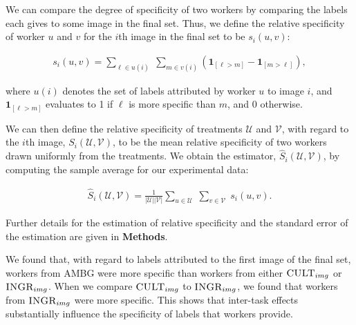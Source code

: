\documentclass[letterpaper,twocolumn]{article}
\begin{document}
We can compare the degree of specificity of two workers by comparing the 
labels each gives to some image in the final set.  Thus, we define the relative
specificity of worker $u$ and $v$ for the $i$th image in the final set to be
$s_i(u,v)$:

\begin{align}
	s_i(u,v) = \sum_{\ell \in u(i) } \;
	\sum_{m \in v(i)} 
	\left(\mathbf{1}_{[\ell > m]} - \mathbf{1}_{[m>\ell]}\right),
	\label{eq:worker-specificity}
\end{align}

where $u(i)$ denotes the set of labels attributed by worker $u$ to image $i$, 
and $\mathbf{1}_{[\ell > m]}$ evaluates to 1 if $\ell$ is more specific than 
$m$, and 0 otherwise.

We can then define the relative specificity of treatments $\mathcal{U}$ and 
$\mathcal{V}$, with regard to
the $i$th image, $S_i(\mathcal{U},\mathcal{V})$, to be the mean
relative specificity of two workers drawn uniformly from the treatments.  
We obtain the estimator, $\hat{S}_i(\mathcal{U},\mathcal{V})$, by computing
the sample average for our experimental data:

\begin{align}
	\hat{S}_i(\mathcal{U},\mathcal{V}) = 
	\frac{1}{|\mathcal{U}| |\mathcal{V}|}
	\sum_{u \in \mathcal{U}} \;
	\sum_{v \in \mathcal{V}} \;
		s_i(u,v).
		\label{eq:specificity}
\end{align}

Further details for the estimation of relative specificity and the standard
error of the estimation are given in \textbf{Methods}.

We found that, with regard to labels attributed to the first image of the 
final set, workers from \textsc{AMBG} were more specific than workers from
either $\textsc{CULT}_{img}$ or $\textsc{INGR}_{img}$.  When we compare 
$\textsc{CULT}_{img}$ to $\textsc{INGR}_{img}$, we found that workers from
$\textsc{INGR}_{img}$ were more specific.  This shows that inter-task 
effects substantially influence the specificity of labels that workers provide.
\end{document}
